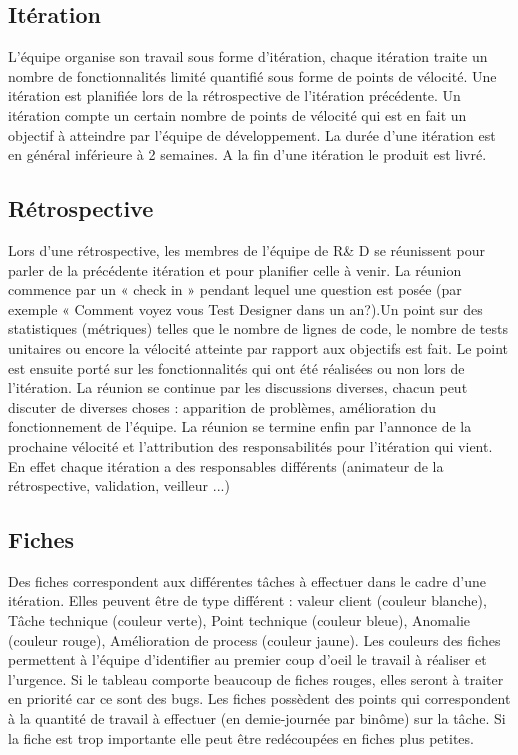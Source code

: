 \documentclass{article}
\begin{document}
\subsection{Itération}
L'équipe organise son travail sous forme d'itération, chaque itération traite un nombre de fonctionnalités limité quantifié sous forme de points de vélocité. Une itération est planifiée lors de la rétrospective de l'itération précédente. Un itération compte un certain nombre de points de vélocité qui est en fait un objectif à atteindre par l'équipe de développement. La durée d'une itération est en général inférieure à 2 semaines. A la fin d'une itération le produit est livré.
\subsection{Rétrospective}
Lors d'une rétrospective,  les membres de l'équipe de R\& D se réunissent pour parler de la précédente itération et pour planifier celle à venir. La réunion commence par un « check in » pendant lequel une question est posée (par exemple « Comment voyez vous Test Designer dans un an?).Un point sur des statistiques (métriques) telles que le nombre de lignes de code, le nombre de tests unitaires ou encore la vélocité atteinte par rapport aux objectifs est fait. Le point est ensuite porté sur les fonctionnalités qui ont été réalisées ou non lors de l'itération. La réunion se continue par les discussions diverses, chacun peut discuter de diverses choses : apparition de problèmes, amélioration du fonctionnement de l'équipe. La réunion se termine enfin par l'annonce de la prochaine vélocité et l'attribution des responsabilités pour l'itération qui vient. En effet chaque itération a des responsables différents (animateur de la rétrospective, validation, veilleur ...)
\subsection{Fiches}
Des fiches correspondent aux différentes t\^aches à effectuer dans le cadre d'une itération. Elles peuvent \^etre de type différent : valeur client (couleur blanche), T\^ache technique (couleur verte), Point technique (couleur bleue), Anomalie (couleur rouge), Amélioration de process (couleur jaune). Les couleurs des fiches permettent à l'équipe d'identifier au premier coup d'oeil le travail à réaliser et l'urgence. Si le tableau comporte beaucoup de fiches rouges, elles seront à traiter en priorité car ce sont des bugs. Les fiches possèdent des points qui correspondent à la quantité de travail à effectuer (en demie-journée par bin\^ome) sur la t\^ache. Si la fiche est trop importante elle peut \^etre redécoupées en fiches plus petites.
\end{document}
